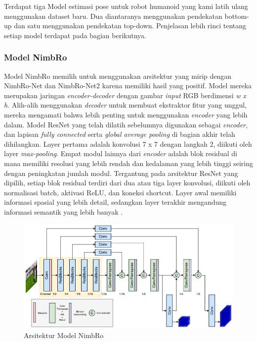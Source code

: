 Terdapat tiga Model estimasi pose untuk robot humanoid yang kami latih ulang menggunakan dataset baru. Dua diantaranya menggunakan pendekatan bottom-up dan satu menggunakan pendekatan top-down. Penjelasan lebih rinci tentang setiap model terdapat pada bagian berikutnya.

\subsubsection{Model NimbRo}
\label{subsubsec:nimbromodel}

Model NimbRo memilih untuk menggunakan arsitektur yang mirip dengan NimbRo-Net dan NimbRo-Net2 karena memiliki hasil yang positif.
Model mereka merupakan jaringan \emph{encoder-decoder} dengan gambar \emph{input} RGB berdimensi \emph{w x h}. Alih-alih menggunakan \emph{decoder} untuk membuat ekstraktor fitur yang unggul, mereka mengamati bahwa lebih penting untuk menggunakan \emph{encoder} yang lebih dalam.
Model ResNet yang telah dilatih sebelumnya \parencite{he2016} digunakan sebagai \emph{encoder}, dan lapisan \emph{fully connected} serta \emph{global average pooling} di bagian akhir telah dihilangkan.
Layer pertama adalah konvolusi 7 x 7 dengan langkah 2, diikuti oleh layer \emph{max-pooling}. Empat modul lainnya dari \emph{encoder} adalah blok residual di mana memiliki resolusi yang lebih rendah dan kedalaman yang lebih tinggi seiring dengan peningkatan jumlah modul.
Tergantung pada arsitektur ResNet yang dipilih, setiap blok residual terdiri dari dua atau tiga layer konvolusi, diikuti oleh normalisasi batch, aktivasi ReLU, dan koneksi shortcut. Layer awal memiliki informasi spasial yang lebih detail,
sedangkan layer terakhir mengandung informasi semantik yang lebih banyak \parencite{amini2021}.

\begin{figure}[ht]
  \centering
  \includegraphics[scale=0.9]{gambar/nimbro-architecture.png}
  \caption{Arsitektur Model NimbRo}
  \label{fig:nimbro-model-architecture}
\end{figure}

